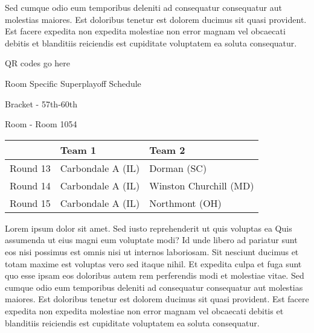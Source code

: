 \documentclass{article}%
\begin{document}
\newline%
Sed cumque odio eum temporibus deleniti ad consequatur consequatur aut molestias maiores. Est doloribus tenetur est dolorem ducimus sit quasi provident. Est facere expedita non expedita molestiae non error magnam vel obcaecati debitis et blanditiis reiciendis est cupiditate voluptatem ea soluta consequatur.%
\vspace*{140pt}%
\begin{center}%
\begin{Huge}%
QR codes go here%
\end{Huge}%
\end{center}%
\newpage%
\begin{center}%
\begin{Huge}%
Room Specific Superplayoff Schedule%
\end{Huge}%
\vspace*{8pt}%
\linebreak%
\begin{Large}%
Bracket {-} 57th{-}60th%
\end{Large}%
\vspace*{8pt}%
\linebreak%
\vspace*{8pt}%
\begin{Large}%
Room {-} Room 1054%
\end{Large}%
\end{center}%
%
\begin{tabularx}{\textwidth}{|c|Y|Y|}%
\hline%
&Team 1&Team 2\\%
\hline%
Round 13&Carbondale A (IL)&Dorman (SC)\\%
Round 14&Carbondale A (IL)&Winston Churchill (MD)\\%
Round 15&Carbondale A (IL)&Northmont (OH)\\%
\hline%
\end{tabularx}%
\vspace*{8pt}%
\newline%
Lorem ipsum dolor sit amet. Sed iusto reprehenderit ut quis voluptas ea Quis assumenda ut eius magni eum voluptate modi? Id unde libero ad pariatur sunt eos nisi possimus est omnis nisi ut internos laboriosam. Sit nesciunt ducimus et totam maxime est voluptas vero sed itaque nihil. Et expedita culpa et fuga sunt quo esse ipsam eos doloribus autem rem perferendis modi et molestiae vitae.\newline%
\newline%
Sed cumque odio eum temporibus deleniti ad consequatur consequatur aut molestias maiores. Est doloribus tenetur est dolorem ducimus sit quasi provident. Est facere expedita non expedita molestiae non error magnam vel obcaecati debitis et blanditiis reiciendis est cupiditate voluptatem ea soluta consequatur.%
\end{document}
